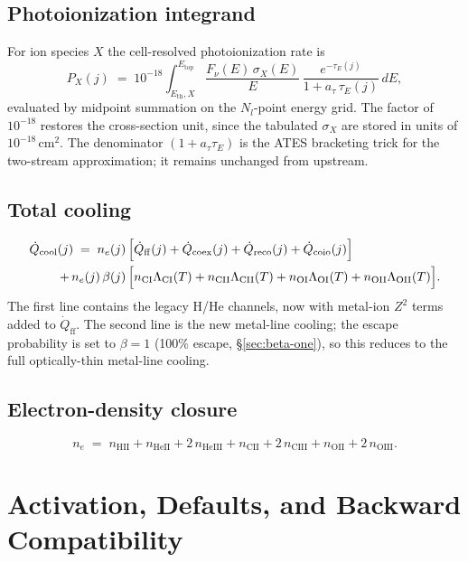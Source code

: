 \documentclass[english,a4paper]{my_memo}
\begin{document}
\subsection{Photoionization integrand}

For ion species \(X\) the cell-resolved photoionization rate is
\[
  P_X(j) \;=\; 10^{-18}\!\int_{E_\mathrm{th}, X}^{E_\mathrm{top}}\!\!
  \frac{F_\nu(E)\, \sigma_X(E)}{E}\,
  \frac{e^{-\tau_E(j)}}{1 + a_\tau\,\tau_E(j)}\,dE,
\]
evaluated by midpoint summation on the \(N_l\)-point energy grid.
The factor of \(10^{-18}\) restores the cross-section unit, since the
tabulated \(\sigma_X\) are stored in units of
\(10^{-18}\,\mathrm{cm}^{2}\).  The denominator
\((1 + a_\tau\tau_E)\) is the ATES bracketing trick for the
two-stream approximation; it remains unchanged from upstream.

\subsection{Total cooling}

\begin{align}
\dot{Q}_{\mathrm{cool}}(j) \;=\;
n_e(j)\,&\Bigl[
\dot{Q}_\mathrm{ff}(j)
+ \dot{Q}_\mathrm{coex}(j)
+ \dot{Q}_\mathrm{reco}(j)
+ \dot{Q}_\mathrm{coio}(j)\Bigr] \notag\\
+\, n_e(j)\,\beta(j)\,&\Bigl[
n_\mathrm{CI}\Lambda_\mathrm{CI}(T)
+ n_\mathrm{CII}\Lambda_\mathrm{CII}(T)
+ n_\mathrm{OI}\Lambda_\mathrm{OI}(T)
+ n_\mathrm{OII}\Lambda_\mathrm{OII}(T)\Bigr].
\end{align}
The first line contains the legacy H/He channels, now with metal-ion
\(Z^{2}\) terms added to \(\dot{Q}_\mathrm{ff}\).  The second line is
the new metal-line cooling; the escape probability is set to
\(\beta = 1\) (100\% escape, \S\ref{sec:beta-one}), so this reduces to
the full optically-thin metal-line cooling.

\subsection{Electron-density closure}

\[
  n_e \;=\; n_\mathrm{HII}
          + n_\mathrm{HeII} + 2\,n_\mathrm{HeIII}
          + n_\mathrm{CII}  + 2\,n_\mathrm{CIII}
          + n_\mathrm{OII}  + 2\,n_\mathrm{OIII}.
\]

\section{Activation, Defaults, and Backward Compatibility}
\end{document}
